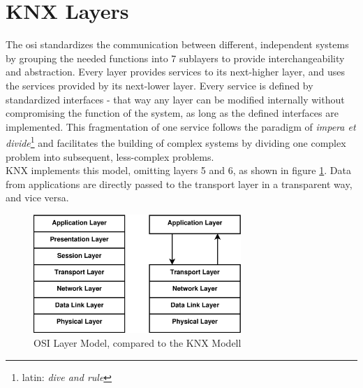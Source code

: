 \section{KNX Layers}

The \gls{osi} standardizes the communication between different, independent systems
by grouping the needed functions into 7 sublayers to provide interchangeability and abstraction. Every layer provides services to its next-higher layer, and
uses the services provided by its next-lower layer. Every service is defined by standardized interfaces - that way any layer can be modified internally without
compromising the function of the system, as long as the defined interfaces are implemented. This fragmentation of one service follows the paradigm of 
\textit{impera et divide}\footnote{latin: \textit{dive and rule}} and facilitates the building of complex systems by dividing one complex problem into subsequent,
less-complex problems.
\\
KNX implements this model, omitting 
layers 5 and 6, as shown in figure \ref{fig:knxlayers}. Data from applications are directly passed to the transport layer in a transparent way, and vice versa.
\begin{figure}
    \centering
     \includegraphics[width=0.7\textwidth]{figures/isoOSI.eps}

    \caption{OSI Layer Model, compared to the KNX Modell}
    \label{fig:knxlayers}
\end{figure}

